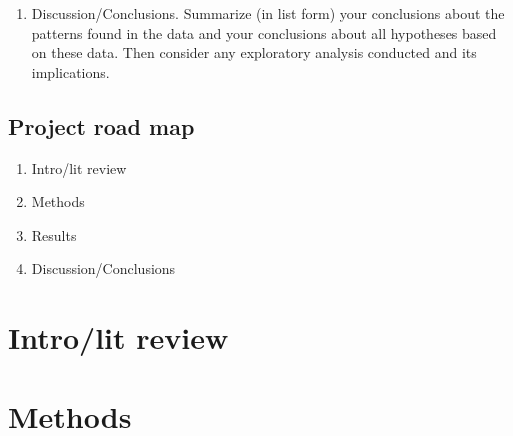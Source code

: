 \documentclass[
]{book}
\providecommand{\tightlist}{%
  \setlength{\itemsep}{0pt}\setlength{\parskip}{0pt}}
\begin{document}
\begin{enumerate}
  \begin{enumerate}
  \def\labelenumii{\roman{enumii})}
  \tightlist
  \item
    Analysis 1 (e.g., accuracy rates for each group; ANOVA main effect). Analysis 1 result. Hypothesis supported or not?
  \item
    Analysis 2 (e.g., Factor 2 main effect of levels?). Analysis 2 result. Implications for hypotheses?
  \item
    Etc. for each planned type of analyis for each variable (planned analysis, result, status of hypothesis based on this result)
  \item
    Describe any exploratory analysis conducted, findings, and implications\footnote{Note the implications for hypotheses will not really tend to be elaborated on in depth in the results section, although they might be briefly mentioned. E.g., As predicted, accuracy improved more rapidly over blocks in group 1 than group 2.}
  \end{enumerate}
\item
  Discussion/Conclusions. Summarize (in list form) your conclusions about the patterns found in the data and your conclusions about all hypotheses based on these data. Then consider any exploratory analysis conducted and its implications.
\end{enumerate}

\hypertarget{project-road-map}{%
\subsection{Project road map}\label{project-road-map}}

\begin{enumerate}
\def\labelenumi{\arabic{enumi}.}
\tightlist
\item
  Intro/lit review
\item
  Methods
\item
  Results
\item
  Discussion/Conclusions
\end{enumerate}

\hypertarget{introlit-review}{%
\section{Intro/lit review}\label{introlit-review}}

\hypertarget{methods}{%
\section{Methods}\label{methods}}
\end{document}
